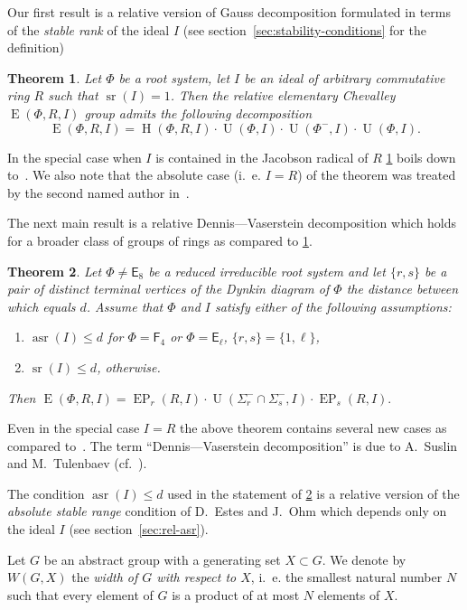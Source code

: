 \documentclass[12pt]{amsart}
\theoremstyle{plain}
\newtheorem{thm}{Theorem}
\numberwithin{equation}{section}
\numberwithin{lemma}{section}
\theoremstyle{definition}
\theoremstyle{remark}
\DeclareMathOperator{\G}{G}
\DeclareMathOperator{\SL}{SL}
\DeclareMathOperator{\E}{E}
\DeclareMathOperator{\EP}{EP}
\DeclareMathOperator{\Hh}{H}
\DeclareMathOperator{\U}{U}
\DeclareMathOperator{\sr}{sr}
\DeclareMathOperator{\asr}{asr}
\newcommand{\rE}{\mathsf{E}}
\newcommand{\rF}{\mathsf{F}}
\begin{document}
Our first result is a relative version of Gauss decomposition formulated in terms of the \emph{stable rank} of the ideal $I$ (see section~\ref{sec:stability-conditions} for the definition)
\begin{thm}\label{thm:srRI1}
Let $\Phi$ be a root system, let $I$ be an ideal of arbitrary commutative ring $R$ such that $\sr(I)=1$.
Then the relative elementary Chevalley $\E(\Phi, R, I)$ group admits the following decomposition
\[ \E(\Phi, R, I) = \Hh(\Phi, R, I) \cdot \U(\Phi, I) \cdot \U(\Phi^-, I) \cdot \U(\Phi, I). \]
\end{thm}
In the special case when $I$ is contained in the Jacobson radical of $R$ \cref{thm:srRI1} boils down to~\cite[Proposition~2.3]{AbeSuzNormalSubgroups}. 
We also note that the absolute case (i.\, e. $I=R$) of the theorem was treated by the second named author in~\cite{Sm12}.

The next main result is a relative Dennis---Vaserstein decomposition which holds for a broader class of groups of rings as compared to \cref{thm:srRI1}.
\begin{thm}\label{thm:DennisVaserstein}
Let $\Phi \neq \rE_8$ be a reduced irreducible root system and let $\{ r, s \}$ be a pair of distinct terminal vertices of the Dynkin diagram of $\Phi$ the distance between which equals $d$.
Assume that $\Phi$ and $I$ satisfy either of the following assumptions:
\begin{enumerate}
 \item $\asr(I) \leq d$ for $\Phi=\rF_4$ or $\Phi=\rE_\ell$, $\{r, s\} = \{1, \ell \}$, 
 \item $\sr(I) \leq d$, otherwise.
\end{enumerate}
Then $\E(\Phi, R, I) = \EP_r(R, I) \cdot \U(\Sigma^-_r \cap \Sigma^-_s, I) \cdot \EP_s(R, I).$ \end{thm}
Even in the special case $I=R$ the above theorem contains several new cases as compared to~\cite[Theorems~2.5, 4.1]{St78}.
The term ``Dennis---Vaserstein decomposition'' is due to A.~Suslin and M.~Tulenbaev (cf.~\cite[Lemma~2.1]{ST76}).

The condition $\asr(I) \leq d$ used in the statement of \cref{thm:DennisVaserstein} is a relative version of the \emph{absolute stable range} condition of D.~Estes and J.~Ohm which depends only on the ideal $I$ (see section~\ref{sec:rel-asr}).

Let $G$ be an abstract group with a generating set $X \subset G$. 
We denote by $W(G, X)$ the \emph{width of $G$ with respect to $X$}, i.\, e. the smallest natural number $N$ such that every element of $G$ is a product of at most $N$ elements of $X$.
\end{document}
